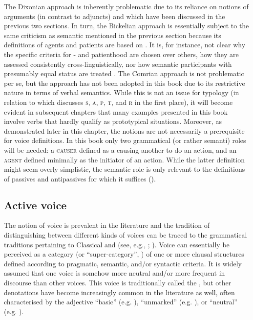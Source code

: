 The Dixonian approach is inherently problematic due to its reliance on notions of arguments (in contrast to adjuncts) and  which have been discussed in the previous two sections. In turn, the Bickelian approach is essentially subject to the same criticism as semantic  mentioned in the previous section because its definitions of agents and patients are based on . It is, for instance, not clear why the specific criteria for - and patienthood are chosen over others, how they are assessed consistently cross-linguistically, nor how semantic participants with presumably equal status are treated \citep[554ff.]{haspelmath:2011a}. The Comrian approach is not problematic per se, but the approach has not been adopted in this book due to its restrictive nature in terms of verbal semantics. While this is not an issue for  typology (in relation to which \citeauthor{haspelmath:2011a} discusses \textsc{s}, \textsc{a}, \textsc{p}, \textsc{t}, and \textsc{r} in the first place), it will become evident in subsequent chapters that many examples presented in this book involve verbs that hardly qualify as prototypical  situations. Moreover, as demonstrated later in this chapter, the notions are not necessarily a prerequisite for voice definitions. In this book only two grammatical (or rather semanti) roles will be needed: a \textsc{causer} defined as a  causing another  to do an action, and an \textsc{agent} defined minimally as the initiator of an action. While the latter definition might seem overly simplistic, the semantic role is only relevant to the definitions of passives and antipassives for which it suffices ().

\subsection{Active voice} \label{active-voice}
The notion of voice is prevalent in the literature and the tradition of distinguishing between different kinds of voices can be traced to the grammatical traditions pertaining to Classical  and  (see, e.g., \citealt[369]{kulikov:2010}; \citealt[1f.]{zuniga:kittila:2019}). Voice can essentially be perceived as a category (or “super-category”, \citealt[1140]{haspelmath:muller-bardey:2004}) of one or more clausal structures defined according to pragmatic, semantic, and/or syntactic criteria. It is widely assumed that one voice is somehow more neutral and/or more frequent in discourse than other voices. This voice is traditionally called the , but other denotations have become increasingly common in the literature as well, often characterised by the adjective “basic” (e.g. \citealt{comrie:1989, melchuk:1993, cooreman:1994, dixon:2000, dixon:aikhenvald:2000, malchukov:2015, malchukov:2016, haspelmath:hartmann:2015}), “unmarked” (e.g. \citealt{kazenin:2001a, haspelmath:muller-bardey:2004}), or “neutral” (e.g. \citealt{kulikov:2010}). 

